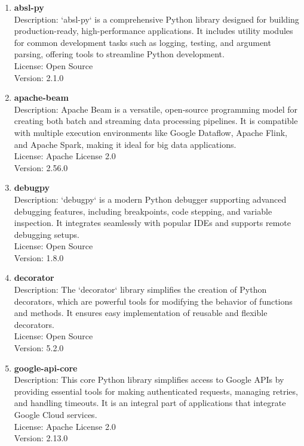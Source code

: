 \begin{enumerate}
	\item \textbf{absl-py} \\
	Description: `absl-py` is a comprehensive Python library designed for building production-ready, high-performance applications. It includes utility modules for common development tasks such as logging, testing, and argument parsing, offering tools to streamline Python development. \\
	License: Open Source \\
	Version: 2.1.0
	
	\item \textbf{apache-beam} \\
	Description: Apache Beam is a versatile, open-source programming model for creating both batch and streaming data processing pipelines. It is compatible with multiple execution environments like Google Dataflow, Apache Flink, and Apache Spark, making it ideal for big data applications. \\
	License: Apache License 2.0 \\
	Version: 2.56.0
	
	\item \textbf{debugpy} \\
	Description: `debugpy` is a modern Python debugger supporting advanced debugging features, including breakpoints, code stepping, and variable inspection. It integrates seamlessly with popular IDEs and supports remote debugging setups. \\
	License: Open Source \\
	Version: 1.8.0
	
	\item \textbf{decorator} \\
	Description: The `decorator` library simplifies the creation of Python decorators, which are powerful tools for modifying the behavior of functions and methods. It ensures easy implementation of reusable and flexible decorators. \\
	License: Open Source \\
	Version: 5.2.0
	
	\item \textbf{google-api-core} \\
	Description: This core Python library simplifies access to Google APIs by providing essential tools for making authenticated requests, managing retries, and handling timeouts. It is an integral part of applications that integrate Google Cloud services. \\
	License: Apache License 2.0 \\
	Version: 2.13.0
	

\end{enumerate}
